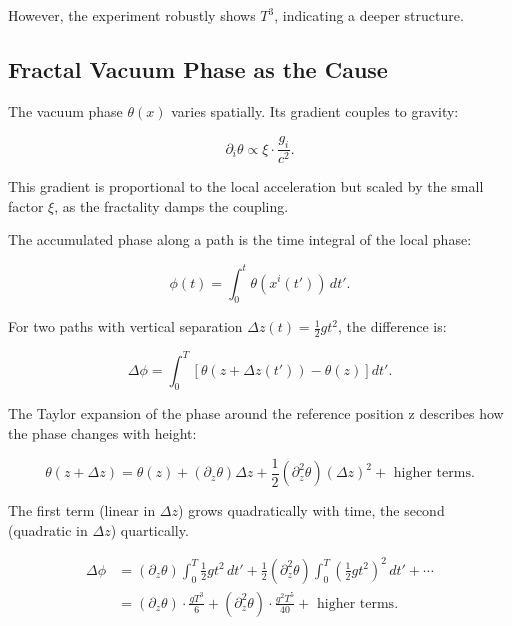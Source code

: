 	However, the experiment robustly shows \(T^3\), indicating a deeper structure.
	
	\subsection*{Fractal Vacuum Phase as the Cause}
	
	The vacuum phase \(\theta(x)\) varies spatially. Its gradient couples to gravity:
	
	\begin{equation}
		\partial_i \theta \propto \xi \cdot \frac{g_i}{c^2}.
	\end{equation}
	
	This gradient is proportional to the local acceleration but scaled by the small factor \(\xi\), as the fractality damps the coupling.
	
	The accumulated phase along a path is the time integral of the local phase:
	
	\begin{equation}
		\phi(t) = \int_0^t \theta(x^i(t')) \, dt'.
	\end{equation}
	
	For two paths with vertical separation \(\Delta z(t) = \frac{1}{2} g t^2\), the difference is:
	
	\begin{equation}
		\Delta \phi = \int_0^T \left[ \theta(z + \Delta z(t')) - \theta(z) \right] dt'.
	\end{equation}
	
	The Taylor expansion of the phase around the reference position z describes how the phase changes with height:
	
	\begin{equation}
		\theta(z + \Delta z) = \theta(z) + (\partial_z \theta) \Delta z + \frac{1}{2} (\partial_z^2 \theta) (\Delta z)^2 + \text{ higher terms}.
	\end{equation}
	
	The first term (linear in \(\Delta z\)) grows quadratically with time, the second (quadratic in \(\Delta z\)) quartically.
	

	
	\[
	\begin{aligned}
		\Delta \phi &= (\partial_z \theta) \int_0^T \frac{1}{2} g t^2 \, dt' + \frac{1}{2} (\partial_z^2 \theta) \int_0^T \left(\frac{1}{2} g t^2\right)^2 \, dt' + \cdots \\
		&= (\partial_z \theta) \cdot \frac{g T^3}{6} + (\partial_z^2 \theta) \cdot \frac{g^2 T^5}{40} + \text{ higher terms}.
	\end{aligned}
	\]
	
